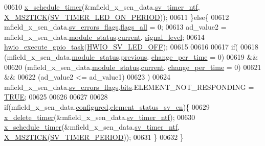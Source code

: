 \begin{DoxyCode}
00610     \hyperlink{a00036_a9e3befaa21e83f196f74201deed85346}{x\_schedule\_timer}(&mfield\_x\_sen\_data.\hyperlink{a00025_ada91b200053f2d93e3639dc4ee3415b4}{sv\_timer\_ntf},
      \hyperlink{a00036_a1732cd929c486b3a225824bb2b3dba36}{X\_MS2TICK}(\hyperlink{a00023_a44e4917fdf9d2a3574a3dd34537d97a7}{SV\_TIMER\_LED\_ON\_PERIOD}));
00611     \}\textcolor{keywordflow}{else}\{
00612      mfield\_x\_sen\_data.\hyperlink{a00025_aaeec6b0609dba31393f337abf1cce3d3}{sv\_errors\_flags}.\hyperlink{a00022_a1caa87b00c878186140c3bac9c8acf3b}{flags\_all} = 0;
00613     ad\_value2  = mfield\_x\_sen\_data.\hyperlink{a00025_adfab5a5d8b45a93dfb13edb24e2b80e3}{module\_status}.\hyperlink{a00019_acf41ffc11da291c2f9f0fcb02ee72b98}{current}.
      \hyperlink{a00019_a4070db8eab0ff93e3fbc1df59872f117}{signal\_level};
00614     \hyperlink{a00058_a0af9eae455fbdf4e77def5bfffa109cb}{hwio\_execute\_gpio\_task}(\hyperlink{a00058_a8fe69ad7e533d2e88cec53c22a56f8fb}{HWIO\_SV\_LED\_OFF});
00615 
00616 
00617     \textcolor{keywordflow}{if}(
00618       (mfield\_x\_sen\_data.\hyperlink{a00025_adfab5a5d8b45a93dfb13edb24e2b80e3}{module\_status}.\hyperlink{a00019_adcb859b2f3983a9c58deab28e59c333f}{previous}.
      \hyperlink{a00019_a0f645dd76b41adc6a966feba8e4bff8c}{change\_per\_time} = 0)
00619       &&
00620       (mfield\_x\_sen\_data.\hyperlink{a00025_adfab5a5d8b45a93dfb13edb24e2b80e3}{module\_status}.\hyperlink{a00019_acf41ffc11da291c2f9f0fcb02ee72b98}{current}.
      \hyperlink{a00019_a0f645dd76b41adc6a966feba8e4bff8c}{change\_per\_time} = 0)
00621       &&
00622       (ad\_value2 <= ad\_value1)
00623       )
00624         mfield\_x\_sen\_data.\hyperlink{a00025_aaeec6b0609dba31393f337abf1cce3d3}{sv\_errors\_flags}.\hyperlink{a00022_ab81eb6fb4f1351ed07b4d6c4dd6f1959}{bits}.ELEMENT\_NOT\_RESPONDING = 
      \hyperlink{a00040_aa8cecfc5c5c054d2875c03e77b7be15d}{TRUE};
00625 
00626 
00627 
00628     \textcolor{keywordflow}{if}(mfield\_x\_sen\_data.\hyperlink{a00025_a94b2d1f6ea4ab334c74d24984dd27843}{configured}.\hyperlink{a00021_afeb3f74725269028a60926f98890c22b}{element\_status\_sv\_en})\{
00629     \hyperlink{a00036_ab69e9af4cfa717e870d587906283635c}{x\_delete\_timer}(&mfield\_x\_sen\_data.\hyperlink{a00025_ada91b200053f2d93e3639dc4ee3415b4}{sv\_timer\_ntf});
00630     \hyperlink{a00036_a9e3befaa21e83f196f74201deed85346}{x\_schedule\_timer}(&mfield\_x\_sen\_data.\hyperlink{a00025_ada91b200053f2d93e3639dc4ee3415b4}{sv\_timer\_ntf},
      \hyperlink{a00036_a1732cd929c486b3a225824bb2b3dba36}{X\_MS2TICK}(\hyperlink{a00023_a8a535456285f4602701c814d7b69cc68}{SV\_TIMER\_PERIOD}));
00631     \}
00632     \}

\end{DoxyCode}
